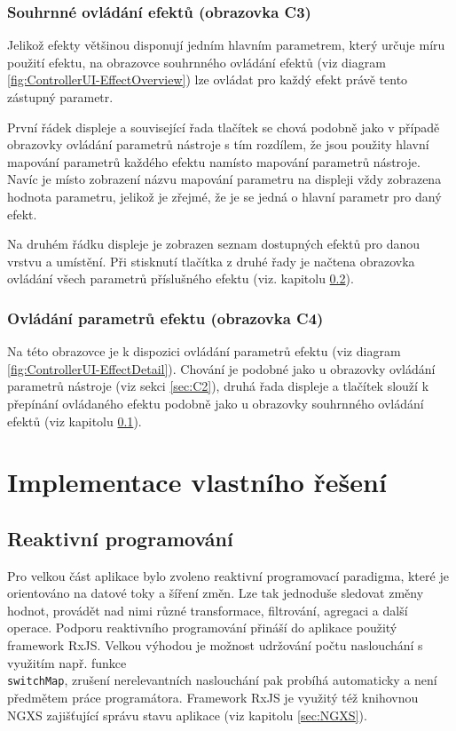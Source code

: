\documentclass[thesis=M,czech]{FITthesis}[2019/03/06]
\begin{document}
		\subsection{Souhrnné ovládání efektů (obrazovka C3)}\label{sec:C3}
			Jelikož efekty většinou disponují jedním hlavním parametrem, který určuje míru použití efektu,
			na obrazovce souhrnného ovládání efektů (viz diagram \ref{fig:ControllerUI-EffectOverview}) lze ovládat pro každý
			efekt právě tento zástupný parametr.
			
			První řádek displeje a související řada tlačítek se chová podobně jako v případě obrazovky ovládání parametrů nástroje
			s tím rozdílem, že jsou použity hlavní mapování parametrů každého efektu namísto mapování parametrů nástroje.
			Navíc je místo zobrazení názvu mapování parametru na displeji vždy zobrazena hodnota parametru, jelikož je zřejmé,
			že je se jedná o hlavní parametr pro daný efekt.
			
			Na druhém řádku displeje je zobrazen seznam dostupných efektů pro danou vrstvu a umístění. Při stisknutí tlačítka
			z druhé řady je načtena obrazovka ovládání všech parametrů příslušného efektu (viz. kapitolu \ref{sec:C4}).
		
		\subsection{Ovládání parametrů efektu (obrazovka C4)}\label{sec:C4}
			Na této obrazovce je k dispozici ovládání parametrů efektu (viz diagram \ref{fig:ControllerUI-EffectDetail}).
			Chování je podobné jako u obrazovky ovládání parametrů nástroje (viz sekci \ref{sec:C2}), druhá řada displeje a tlačítek
			slouží k přepínání ovládaného efektu podobně jako u obrazovky souhrnného ovládání efektů (viz kapitolu \ref{sec:C3}).
		
\chapter{Implementace vlastního řešení}
	\section{Reaktivní programování}
		Pro velkou část aplikace bylo zvoleno reaktivní programovací paradigma, které je orientováno
		na datové toky a šíření změn. Lze tak jednoduše sledovat změny hodnot, provádět 
		nad nimi různé transformace, filtrování, agregaci a další operace. Podporu reaktivního programování přináší do aplikace
		použitý framework RxJS\cite{clow2018observers}. Velkou výhodou je možnost udržování počtu naslouchání
		s využitím např. funkce \\\texttt{switchMap}, zrušení nerelevantních naslouchání pak probíhá automaticky a není předmětem práce programátora.
		Framework RxJS je využitý též knihovnou NGXS zajišťující správu stavu aplikace (viz kapitolu \ref{sec:NGXS}).
\end{document}
